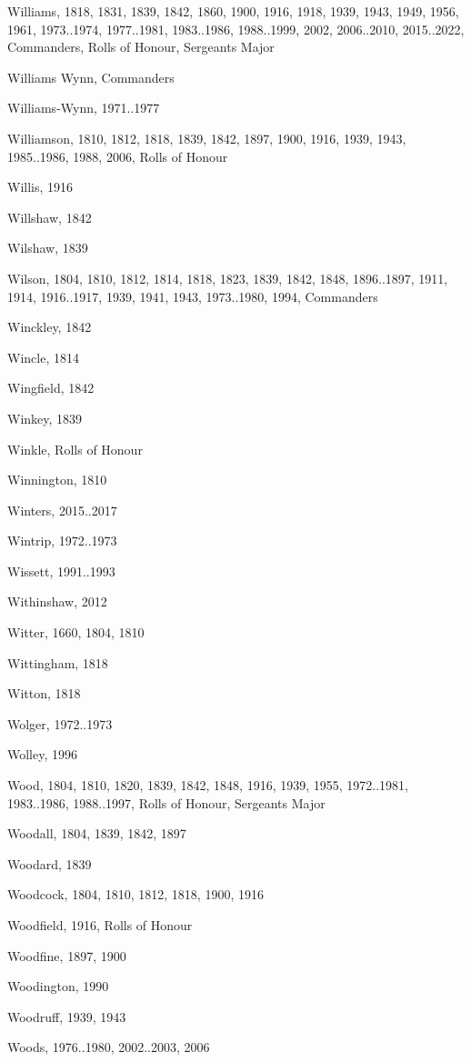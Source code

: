 {\begin{theindex}
\item Williams, 1818, 1831, 1839, 1842, 1860, 1900, 1916, 1918, 1939, 1943, 1949, 1956, 1961, 1973..1974, 1977..1981, 1983..1986, 1988..1999, 2002, 2006..2010, 2015..2022, Commanders, Rolls of Honour, Sergeants Major
\item Williams Wynn, Commanders
\item Williams-Wynn, 1971..1977
\item Williamson, 1810, 1812, 1818, 1839, 1842, 1897, 1900, 1916, 1939, 1943, 1985..1986, 1988, 2006, Rolls of Honour
\item Willis, 1916
\item Willshaw, 1842
\item Wilshaw, 1839
\item Wilson, 1804, 1810, 1812, 1814, 1818, 1823, 1839, 1842, 1848, 1896..1897, 1911, 1914, 1916..1917, 1939, 1941, 1943, 1973..1980, 1994, Commanders
\item Winckley, 1842
\item Wincle, 1814
\item Wingfield, 1842
\item Winkey, 1839
\item Winkle, Rolls of Honour
\item Winnington, 1810
\item Winters, 2015..2017
\item Wintrip, 1972..1973
\item Wissett, 1991..1993
\item Withinshaw, 2012
\item Witter, 1660, 1804, 1810
\item Wittingham, 1818
\item Witton, 1818
\item Wolger, 1972..1973
\item Wolley, 1996
\item Wood, 1804, 1810, 1820, 1839, 1842, 1848, 1916, 1939, 1955, 1972..1981, 1983..1986, 1988..1997, Rolls of Honour, Sergeants Major
\item Woodall, 1804, 1839, 1842, 1897
\item Woodard, 1839
\item Woodcock, 1804, 1810, 1812, 1818, 1900, 1916
\item Woodfield, 1916, Rolls of Honour
\item Woodfine, 1897, 1900
\item Woodington, 1990
\item Woodruff, 1939, 1943
\item Woods, 1976..1980, 2002..2003, 2006

\end{theindex}}
